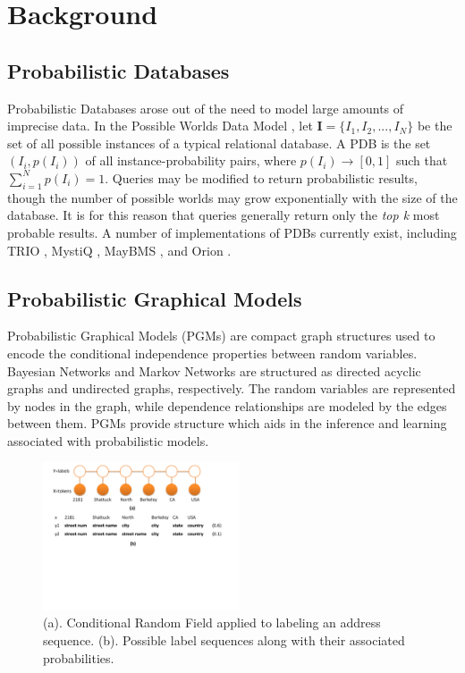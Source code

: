\section{Background}
\subsection{Probabilistic Databases}
Probabilistic Databases arose out of the need to model large amounts of imprecise data.  In the Possible Worlds Data Model \cite{Dalvi07}, let $\mathbf{I}=\{I_{1},I_{2},...,I_{N}\}$ be the set of all possible instances of a typical relational database.  A PDB is the set $(I_{i},p(I_{i}))$ of all instance-probability pairs, where $p(I_{i})\rightarrow[0,1]$ such that $\sum_{i=1}^{N}p(I_{i})=1$.  Queries may be modified to return probabilistic results, though the number of possible worlds may grow exponentially with the size of the database.  It is for this reason that queries generally return only the \textit{top k} most probable results.  A number of implementations of PDBs currently exist, including TRIO \cite{DBLP:conf/vldb/AgrawalBSHNSW06}, MystiQ \cite{Boulos:2005:MSF:1066157.1066277}, MayBMS \cite{Huang09maybms:a}, and Orion \cite{DBLP:conf/comad/SinghMMPHS08}.

\subsection{Probabilistic Graphical Models}
Probabilistic Graphical Models (PGMs) \cite{Koller+Friedman:09, Jordan98} are compact graph structures used to encode the conditional independence properties between random variables.  Bayesian Networks and Markov Networks are structured as directed acyclic graphs and undirected graphs, respectively.  The random variables are represented by nodes in the graph, while dependence relationships are modeled by the edges between them.  PGMs provide structure which aids in the inference and learning associated with probabilistic models.

\begin{figure}
\centering
\includegraphics[width=0.52\textwidth]{images/CRF1.pdf}
\caption[example]{\label{fig:CRFexample}(a). Conditional Random Field applied to labeling an address sequence. (b). Possible label sequences along with their associated probabilities.}
\end{figure}

